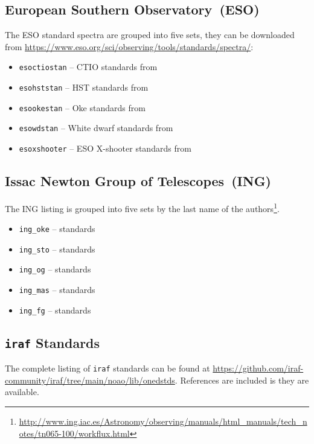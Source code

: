 \documentclass[linenumbers, twocolumn]{aastex631}
\begin{document}
\subsection*{European Southern Observatory~(ESO)}
The ESO standard spectra are grouped into five sets, they can be downloaded from \url{https://www.eso.org/sci/observing/tools/standards/spectra/}:

\begin{itemize}
    \item \texttt{esoctiostan} -- CTIO standards from \citet{1992PASP..104..533H, 1994PASP..106..566H}
    \item \texttt{esohststan} -- HST standards from \citet{1995AJ....110.1316B, 1996AJ....111.1743B}
    \item \texttt{esookestan} -- Oke standards from \citet{1990AJ.....99.1621O}
    \item \texttt{esowdstan} -- White dwarf standards from \citet{1995AJ....110.1316B}
    \item \texttt{esoxshooter} -- ESO X-shooter standards from \citet{2014Msngr.158...16M, 2014A&A...568A...9M}
\end{itemize}


\subsection*{Issac Newton Group of Telescopes~(ING)}

The ING listing is grouped into five sets by the last name of the authors\footnote{\url{http://www.ing.iac.es/Astronomy/observing/manuals/html_manuals/tech_notes/tn065-100/workflux.html}}.

\begin{itemize}
    \item \texttt{ing\_oke} -- \citet{1990AJ.....99.1621O} standards
    \item \texttt{ing\_sto} -- \citet{1977ApJ...218..767S} standards
    \item \texttt{ing\_og} -- \citet{1965ApJ...141...83E} standards
    \item \texttt{ing\_mas} -- \citet{1988ApJ...328..315M} standards
    \item \texttt{ing\_fg} -- \citet{1984PASP...96..530F} standards
\end{itemize}

\subsection*{\texttt{iraf} Standards}
The complete listing of \texttt{iraf} standards can be found at
\url{https://github.com/iraf-community/iraf/tree/main/noao/lib/onedstds}.
References are included is they are available.
\end{document}
